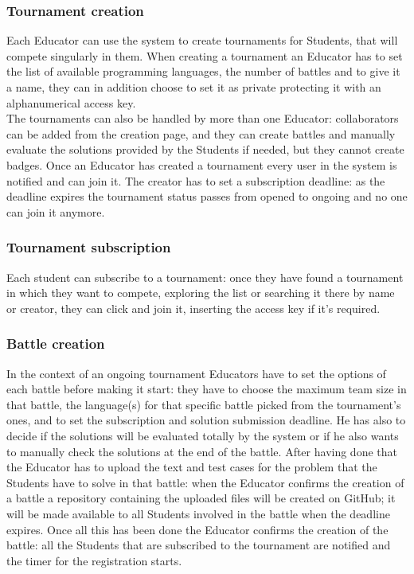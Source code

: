 \documentclass{article}
\begin{document}
\subsubsection{Tournament creation}
Each Educator can use the system to create tournaments for Students, that will compete singularly in them.
When creating a tournament an Educator has to set the list of available programming languages, the number of battles and to give it a name, they can in addition choose to set it as private protecting it with an alphanumerical access key.\\
The tournaments can also be handled by more than one Educator: collaborators can be added from the creation page, and they can create battles and manually evaluate the solutions provided by the Students if needed, but they cannot create badges.
Once an Educator has created a tournament every user in the system is notified and can join it.
The creator has to set a subscription deadline: as the deadline expires the tournament status passes from opened to ongoing and no one can join it anymore.
\subsubsection{Tournament subscription}
Each student can subscribe to a tournament: once they have found a tournament in which they want to compete, exploring the list or searching it there by name or creator, they can click and join it, inserting the access key if it's required.
\subsubsection{Battle creation}
In the context of an ongoing tournament Educators have to set the options of each battle before making it start: they have to choose the maximum team size in that battle, the language(s) for that specific battle picked from the tournament's ones, and to set the subscription and solution submission deadline.
He has also to decide if the solutions will be evaluated totally by the system or if he also wants to manually check the solutions at the end of the battle.
After having done that the Educator has to upload the text and test cases for the problem that the Students have to solve in that battle: when the Educator confirms the creation of a battle a repository containing the uploaded files will be created on GitHub; it will be made available to all Students involved in the battle when the deadline expires.
Once all this has been done the Educator confirms the creation of the battle: all the Students that are subscribed to the tournament are notified and the timer for the registration starts.
\end{document}
